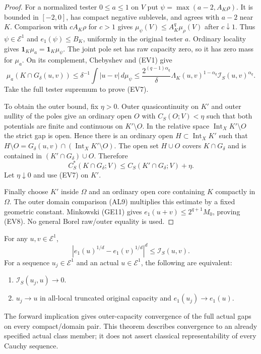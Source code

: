 \begin{proof}
For a normalized tester $0\leq a\leq1$ on $V$ put
$\psi=\max(a-2,A_K\rho)$.
It is bounded in $[-2,0]$, has compact negative sublevels,
and agrees with $a-2$ near $K$.
Comparison with $cA_K\rho$ for $c>1$ gives
$\mu_\psi(V)\leq A_K^q\mu_\rho(V)$ after $c\downarrow1$.
Thus $\psi\in\mathcal E^1$ and $e_1(\psi)\leq B_K$,
uniformly in the original tester $a$. Ordinary locality
gives $\mathbf1_K\mu_a=\mathbf1_K\mu_\psi$.
The joint pole set has raw capacity zero, so it has zero
mass for $\mu_a$. On its complement, Chebyshev and (EV1)
give
\[
 \mu_a(K\cap G_\delta(u,v))
       \leq\delta^{-1}\int|u-v|\,d\mu_\psi
       \leq\frac{2^{(q-1)\alpha_q}}\delta
             \Lambda_K(u,v)^{1-\alpha_q}
                          \mathscr I_S(u,v)^{\alpha_q}.
\]
Take the full tester supremum to prove (EV7).

To obtain the outer bound, fix $\eta>0$. Outer
quasicontinuity on $K'$ and outer nullity of the poles
give an ordinary open $O$ with $C_S(O;V)<\eta$ such
that both potentials are finite and continuous on
$K'\setminus O$. In the relative space
$\operatorname{Int}_X K'\setminus O$ the strict gap is
open. Hence there is an ordinary open $H\subset
\operatorname{Int}_X K'$ such that
$H\setminus O=G_\delta(u,v)\cap
(\operatorname{Int}_X K'\setminus O)$.
The open set $H\cup O$ covers $K\cap G_\delta$ and is
contained in $(K'\cap G_\delta)\cup O$. Therefore
\[
 C_S^*(K\cap G_\delta;V)
              \leq C_S(K'\cap G_\delta;V)+\eta.
\]
Let $\eta\downarrow0$ and use (EV7) on $K'$.

Finally choose $K'$ inside $\Omega$ and an ordinary open
core containing $K$ compactly in $\Omega$. The outer
domain comparison (AL9) multiplies this estimate by a fixed
geometric constant. Minkowski (GE11) gives
$e_1(u+v)\leq2^{q+1}M_0$, proving (EV8).
No general Borel raw/outer equality is used.
\end{proof}

\begin{theorem}
\label{thm:r11-strong-first-energy-topology}
For any $u,v\in\mathcal E^1$,
\[
 \left|e_1(u)^{1/d}-e_1(v)^{1/d}\right|^d
                                      \leq\mathscr I_S(u,v).
 \tag{EV9}
\]
For a sequence $u_j\in\mathcal E^1$ and an actual
$u\in\mathcal E^1$, the following are equivalent:
\begin{enumerate}
\item $\mathscr I_S(u_j,u)\to0$.
\item $u_j\to u$ in all-local truncated original capacity
and $e_1(u_j)\to e_1(u)$.
\end{enumerate}
The forward implication gives outer-capacity convergence
of the full actual gaps on every compact/domain pair.
This theorem describes convergence to an already specified
actual class member; it does not assert classical
representability of every Cauchy sequence.
\end{theorem}

